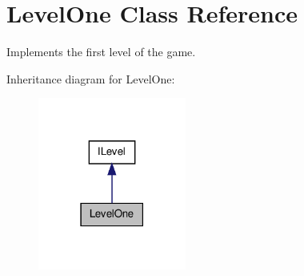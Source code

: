 \hypertarget{class_level_one}{\section{Level\-One Class Reference}
\label{class_level_one}
}


Implements the first level of the game.  




Inheritance diagram for Level\-One\-:\nopagebreak
\begin{figure}[H]
\begin{center}
\leavevmode
\includegraphics[width=138pt]{class_level_one__inherit__graph}
\end{center}
\end{figure}
